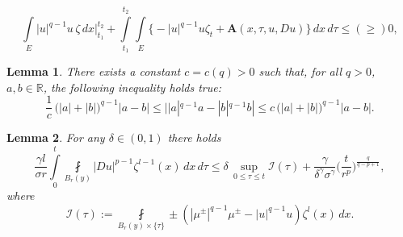 \documentclass[10pt,a4paper]{amsart}
\newtheorem{lemma}{Lemma}
\begin{document}
\begin{equation}\label{eq2.1}
\int\limits_{E}|u|^{q-1} u\,\zeta\,dx\Big|^{t_2}_{t_1}+\int\limits_{t_1}^{t_2}\int\limits_E\big\{-|u|^{q-1} u \zeta_t+ \mathbf{A}(x, \tau, u, D u)\big\}\,dx\,d\tau \leqslant (\geqslant ) 0,
\end{equation}

\begin{lemma}\label{lem2.1}
There exists a constant $c = c(q)>0$ such that, for all $q>0$, 
 $a, b\in \mathbb{R}$, the following inequality holds true:
 \begin{equation*}
 \frac{1}{c}\,\big(|a|+|b|\big)^{q-1}|a-b|\leqslant ||a|^{q-1}a -|b|^{q-1} b|\leqslant c\,\big(|a|+|b|\big)^{q-1}|a-b|.
 \end{equation*}
\end{lemma}

\begin{lemma}\label{lem6.2}
For any $\delta \in (0, 1)$ there holds
\begin{equation}\label{eq6.7}
\frac{\gamma l}{\sigma r}\int\limits^t_0\fint\limits_{B_{r}(y)}|D u|^{p-1} \zeta^{l-1}(x)\,dx\,d\tau\leqslant \delta\,\sup\limits_{0\leqslant \tau\leqslant t}\mathcal{I}(\tau)+\frac{\gamma}{\delta^\gamma \sigma^\gamma}
\Big(\frac{t}{r^p}\Big)^{\frac{q}{q-p+1}},
\end{equation}
where
$$\mathcal{I}(\tau):=\fint\limits_{B_{r}(y)\times\{\tau\}}\pm(|\mu^{\pm}|^{q-1}\mu^{\pm}-|u|^{q-1}u)\zeta^l(x)\,dx.$$
\end{lemma}
\end{document}

